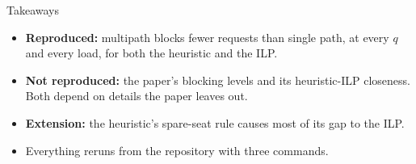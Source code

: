 \documentclass[aspectratio=169,11pt]{beamer}
\begin{document}
\begin{frame}{Takeaways}
\begin{itemize}
\item \textbf{Reproduced:} multipath blocks fewer requests than single path, at every $q$ and every load, for both the heuristic and the ILP.
\item \textbf{Not reproduced:} the paper's blocking levels and its heuristic-ILP closeness. Both depend on details the paper leaves out.
\item \textbf{Extension:} the heuristic's spare-seat rule causes most of its gap to the ILP.
\item Everything reruns from the repository with three commands.
\end{itemize}
\end{frame}
\end{document}
